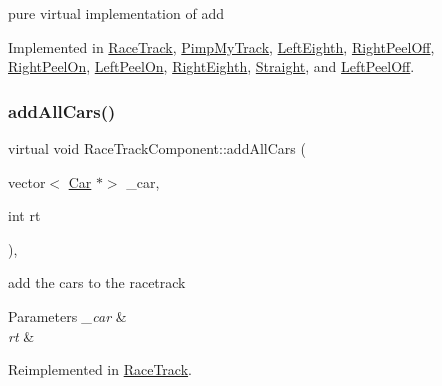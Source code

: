 pure virtual implementation of add 

Implemented in \mbox{\hyperlink{class_race_track_a1a71ace4706e2e08578111fee2c7eac6}{Race\+Track}}, \mbox{\hyperlink{class_pimp_my_track_a22126de4605d351960de212f39936051}{Pimp\+My\+Track}}, \mbox{\hyperlink{class_left_eighth_a8b41dca112e41eda8ec47a5cf4675a3e}{Left\+Eighth}}, \mbox{\hyperlink{class_right_peel_off_a6290d2439262a87a6557cd594cc72823}{Right\+Peel\+Off}}, \mbox{\hyperlink{class_right_peel_on_a474f981bb38dda2758bf896cbf10545b}{Right\+Peel\+On}}, \mbox{\hyperlink{class_left_peel_on_a73ee71ca18d951e4938914361caa395d}{Left\+Peel\+On}}, \mbox{\hyperlink{class_right_eighth_a9ca383bb10f9029d8ed0eb43cfa9edc7}{Right\+Eighth}}, \mbox{\hyperlink{class_straight_a31040b9493c960757e83a2a239865950}{Straight}}, and \mbox{\hyperlink{class_left_peel_off_ae1a279fc9522e6f2e6f5a4c879f01a06}{Left\+Peel\+Off}}.

\mbox{\label{class_race_track_component_afb51617f25b639cf0a98a42a86120937}} 
\subsubsection{\texorpdfstring{add\+All\+Cars()}{addAllCars()}}
{\footnotesize\ttfamily virtual void Race\+Track\+Component\+::add\+All\+Cars (\begin{DoxyParamCaption}\item[{vector$<$ \mbox{\hyperlink{class_car}{Car}} $\ast$$>$}]{\+\_\+car,  }\item[{int}]{rt }\end{DoxyParamCaption})\hspace{0.3cm}{\ttfamily [inline]}, {\ttfamily [virtual]}}

add the cars to the racetrack 
\begin{DoxyParams}{Parameters}
{\em \+\_\+car} & \\
\hline
{\em rt} & \\
\hline
\end{DoxyParams}


Reimplemented in \mbox{\hyperlink{class_race_track_a14ac008331e0a8945fce4cdb59086ba1}{Race\+Track}}.

\mbox{\label{class_race_track_component_aafa6492a0249238db0b91a36cf9bf55b}} 
